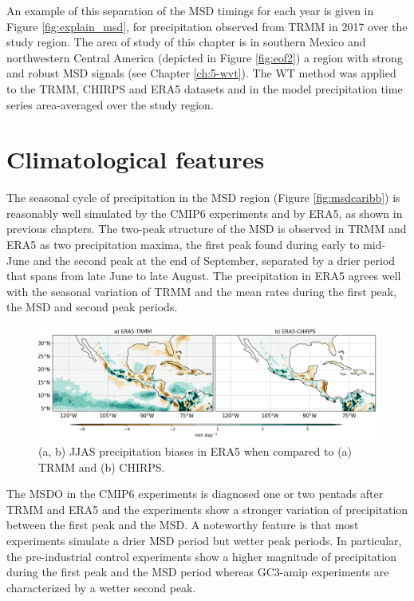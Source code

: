  An example of this separation of the MSD timings for each year is given in Figure \ref{fig:explain_msd}, for precipitation observed from TRMM in 2017 over the study region.
The area of study of this chapter is in southern Mexico and northwestern Central America (depicted in Figure \ref{fig:eof2}) a region with strong and robust MSD signals (see Chapter \ref{ch:5-wvt}). The WT method was applied to the TRMM, CHIRPS and ERA5 datasets and in the model precipitation time series area-averaged over the study region. 


\section{Climatological features}

\label{sq:msdclim} 

The seasonal cycle of precipitation in the MSD region (Figure \ref{fig:msdcaribb}) is reasonably well simulated by the CMIP6 experiments and by ERA5, as shown in previous chapters.
The two-peak structure of the MSD is observed in TRMM and ERA5 as two precipitation maxima, the first peak found during early to mid-June and the second peak at the end of September, separated by a drier period that spans from late June to late August. The precipitation in ERA5  agrees well with the seasonal variation of TRMM and the mean rates during the first peak, the MSD and second peak periods.

\begin{figure}[b!]
\includegraphics[width=\linewidth]{figures/fig_Era5}
\caption[ERA5 precipitation biases]{ (a, b) JJAS precipitation biases in ERA5 when compared to (a) TRMM and (b) CHIRPS. }
\label{fig:era5_bias_pr}
\end{figure}
 

The MSDO in the CMIP6 experiments is diagnosed one or two pentads after TRMM and ERA5 and the experiments show a stronger variation of precipitation between the first peak and the MSD. A noteworthy feature is that most experiments simulate a drier MSD period but wetter peak periods.
In particular, the pre-industrial control experiments show a higher magnitude of precipitation during the first peak and the MSD period whereas GC3-amip experiments are characterized by a wetter second peak. 


